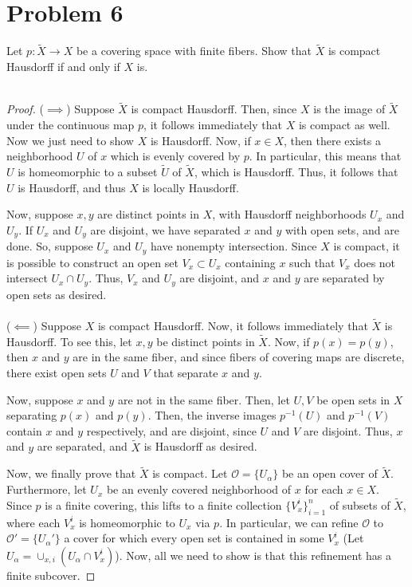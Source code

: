\documentclass[fontsize=11pt]{scrartcl} %
\numberwithin{equation}{section} %
\numberwithin{figure}{section} %
\numberwithin{table}{section} %
\begin{document}
\section*{Problem 6}
Let $p:\tilde{X}\to X$ be a covering space with finite fibers. Show that
$\tilde{X}$ is compact Hausdorff if and only if $X$ is.
\\
\\
\begin{proof}
    ($\implies$) Suppose $\tilde{X}$ is compact Hausdorff. Then, since $X$ is
    the image of $\tilde{X}$ under the continuous map $p$, it follows
    immediately that $X$ is compact as well. Now we just need to show $X$ is
    Hausdorff. Now, if $x\in X$, then there exists a neighborhood $U$ of $x$
    which is evenly covered by $p$. In particular, this means that $U$ is
    homeomorphic to a subset $\tilde{U}$ of $\tilde{X}$, which is Hausdorff.
    Thus, it follows that $U$ is Hausdorff, and thus $X$ is locally Hausdorff.
    
    Now, suppose $x,y$ are distinct points in $X$, with Hausdorff neighborhoods
    $U_x$ and $U_y$. If $U_x$ and $U_y$ are disjoint, we have separated $x$ and
    $y$ with open sets, and are done. So, suppose $U_x$ and $U_y$ have nonempty
    intersection. Since $X$ is compact, it is possible to construct an open set
    $V_x\subset U_x$ containing $x$ such that $V_x$ does not intersect $U_x\cap
    U_y$. Thus, $V_x$ and $U_y$ are disjoint, and $x$ and $y$ are separated by
    open sets as desired.
    \\
    \\
    ($\impliedby$)
    Suppose $X$ is compact Hausdorff. Now, it follows immediately that
    $\tilde{X}$ is Hausdorff. To see this, let $x,y$ be distinct points in
    $\tilde{X}$. Now, if $p(x) = p(y)$, then $x$ and $y$ are in the same fiber,
    and since fibers of covering maps are discrete, there exist open sets $U$
    and $V$ that separate $x$ and $y$. 

    Now, suppose $x$ and $y$ are not in the same fiber. Then, let $U,V$ be open
    sets in $X$ separating $p(x)$ and $p(y)$. Then, the inverse images
    $p^{-1}(U)$ and $p^{-1}(V)$ contain $x$ and $y$ respectively, and are
    disjoint, since $U$ and $V$ are disjoint. Thus, $x$ and $y$ are separated,
    and $\tilde{X}$ is Hausdorff as desired.

    Now, we finally prove that $\tilde{X}$ is compact. Let $\mathscr{O} =
    \{U_{\alpha}\}$ be an open cover of $\tilde{X}$. Furthermore, let $U_x$ be
    an evenly covered neighborhood of $x$ for each $x\in X$. Since $p$ is a
    finite covering, this lifts to a finite collection $\{V_x^i\}_{i=1}^n$ of
    subsets of $\tilde{X}$, where each $V_x^i$ is homeomorphic to $U_x$ via $p$.
    In particular, we can refine $\mathscr{O}$ to $\mathscr{O}' =
    \{U_{\alpha}'\}$ a cover for which every open
    set is contained in some $V_x^i$ (Let $U_{\alpha} = \cup_{x,i}(U_{\alpha}\cap
    V_x^i)$). Now, all we need to show is that this refinement has a finite
    subcover. 


\end{proof}
\end{document}

